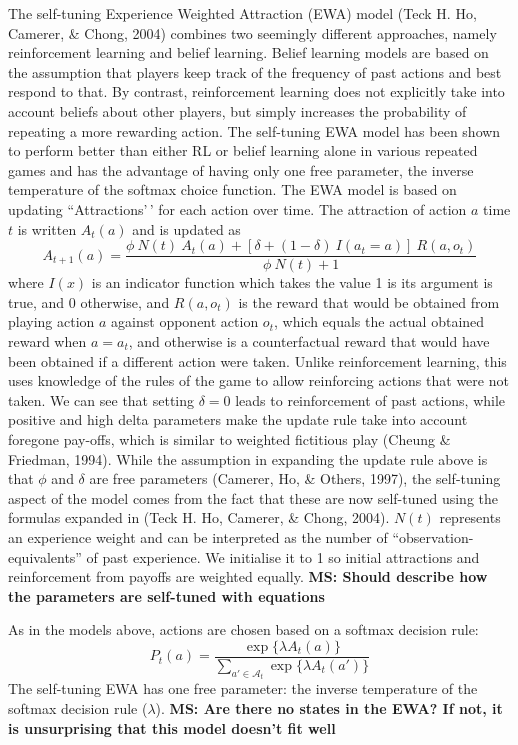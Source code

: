 \documentclass[
  english,
  man,floatsintext]{apa6}
\begin{document}
The self-tuning Experience Weighted Attraction (EWA) model (Teck H. Ho, Camerer, \& Chong, 2004) combines two seemingly different approaches, namely reinforcement learning and belief learning. Belief learning models are based on the assumption that players keep track of the frequency of past actions and best respond to that. By contrast, reinforcement learning does not explicitly take into account beliefs about other players, but simply increases the probability of repeating a more rewarding action. The self-tuning EWA model has been shown to perform better than either RL or belief learning alone in various repeated games and has the advantage of having only one free parameter, the inverse temperature of the softmax choice function. The EWA model is based on updating ``Attractions'\,' for each action over time. The attraction of action \(a\) time \(t\) is written \(A_{t}(a)\) and is updated as
\[ A_{t+1}(a) =  \frac{\phi \ N(t) \ A_{t}(a) + [ \delta + (1-\delta) \ I(a_t = a )] \ R(a,o_t) } {\phi \ N(t) + 1} \]
where \(I(x)\) is an indicator function which takes the value 1 is its argument is true, and 0 otherwise, and \(R(a,o_t)\) is the reward that would be obtained from playing action \(a\) against opponent action \(o_t\), which equals the actual obtained reward when \(a = a_t\), and otherwise is a counterfactual reward that would have been obtained if a different action were taken. Unlike reinforcement learning, this uses knowledge of the rules of the game to allow reinforcing actions that were not taken. We can see that setting \(\delta = 0\) leads to reinforcement of past actions, while positive and high delta parameters make the update rule take into account foregone pay-offs, which is similar to weighted fictitious play (Cheung \& Friedman, 1994). While the assumption in expanding the update rule above is that \(\phi\) and \(\delta\) are free parameters (Camerer, Ho, \& Others, 1997), the self-tuning aspect of the model comes from the fact that these are now self-tuned using the formulas expanded in (Teck H. Ho, Camerer, \& Chong, 2004). \(N(t)\) represents an experience weight and can be interpreted as the number of ``observation-equivalents'' of past experience. We initialise it to 1 so initial attractions and reinforcement from payoffs are weighted equally. \textbf{MS: Should describe how the parameters are self-tuned with equations }

As in the models above, actions are chosen based on a softmax decision rule:
\[P_t(a) = \frac{\exp \{\lambda  A_{t}(a) \} }{\sum_{a' \in \mathcal{A}_t} \exp \{ \lambda A_{t}(a') \} }\]
The self-tuning EWA has one free parameter: the inverse temperature of the softmax decision rule (\(\lambda\)). \textbf{MS: Are there no states in the EWA? If not, it is unsurprising that this model doesn't fit well }
\end{document}
